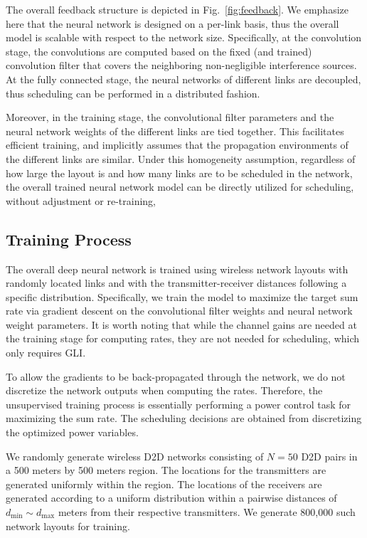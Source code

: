 \documentclass[journal,12pt,onecolumn,draftclsnofoot,]{IEEEtran}
\begin{document}
The overall feedback structure is depicted in Fig.~\ref{fig:feedback}.
We emphasize here that the neural network is designed on a per-link basis, thus
the overall model is scalable with respect to the network size.  Specifically,
at the convolution stage, the convolutions are computed based on the fixed (and
trained) convolution filter that covers the neighboring non-negligible
interference sources. At the fully connected stage, the neural networks of different
links are decoupled, thus scheduling can be performed in a distributed fashion. 

Moreover, in the training stage, the convolutional filter parameters and the
neural network weights of the different links are tied together. This facilitates 
efficient training, and implicitly assumes that the propagation environments of
the different links are similar. Under this homogeneity assumption, 
regardless of how large the layout is and how many links are to be scheduled 
in the network, the overall trained neural network model can be directly
utilized for scheduling, without adjustment or re-training, 


\subsection{Training Process}

The overall deep neural network is trained using wireless network layouts with
randomly located links and with the transmitter-receiver distances following a
specific distribution. Specifically, we train the model to maximize the target
sum rate via gradient descent on the convolutional filter weights and neural network
weight parameters. It is worth noting that while the channel gains are needed at the training stage
for computing rates, they are not needed for scheduling, which only requires GLI.

To allow the gradients to be back-propagated through the network, we do not
discretize the network outputs when computing the rates. Therefore, the
unsupervised training process is essentially performing a power control task
for maximizing the sum rate. The scheduling decisions are obtained from
discretizing the optimized power variables. 

We randomly generate wireless D2D networks consisting of $N=50$ D2D pairs in a
500 meters by 500 meters region. The locations for the transmitters are
generated uniformly within the region. The locations of the receivers are
generated according to a uniform distribution within a pairwise distances of
$d_{\min}\sim d_{\max}$ meters from their respective transmitters. We generate
800,000 such network layouts for training.
\end{document}
